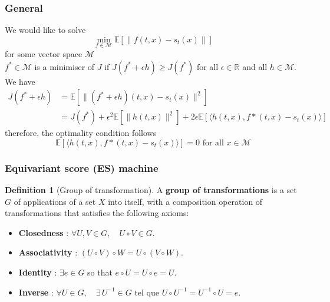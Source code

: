 \documentclass[a4paper,10pt]{article}
\theoremstyle{definition} %
\newtheorem{definition}{Definition}[section]
\theoremstyle{definition} %
\theoremstyle{definition} %
\theoremstyle{definition} %
\newcommand{\R}{\mathbb{R}}
\newcommand{\E}[1]{\mathbb{E} \left[ {#1} \right] }
\newcommand{\0}{\boldsymbol{0}}
\begin{document}
\subsubsection{General}
We would like to solve
\begin{equation*}
    \min_{f\in\mathcal{M}} \E{\| f(t,x)-s_t(x)\|}
\end{equation*}
for some vector space $\mathcal{M}$\\
$f^* \in \mathcal{M}$ is a minimiser of $J$ if $J(f^*+\epsilon h) \geq J(f^*)$ for all $\epsilon \in \R$ and all $h\in \mathcal{M}$. We have
\begin{align*}
    J(f^*+\epsilon h) &= \E{\|(f^*+\epsilon h)(t,x)-s_t(x)\|^2}\\
    & = J(f^*)+\epsilon^2\E{\|h(t,x)\|^2}+2\epsilon\E{\langle h(t,x),f*(t,x) - s_t(x) \rangle}
\end{align*}
therefore, the optimality condition follows
\begin{equation}\label{eq:optimal_condition_score_function}
    \E{\langle h(t,x),f*(t,x) - s_t(x) \rangle} = 0 \text{ for all } x \in \mathcal{M}
\end{equation}

\subsubsection{Equivariant score (ES) machine}
\begin{definition}[Group of transformation]
    A \textbf{group of transformations} is a set \( G \) of applications of a set \( X \) into itself, with a composition operation of transformations that satisfies the following axioms:
    \begin{itemize}[topsep=-5pt]
    \item[] \textbf{Closedness} : \( \forall U, V \in G, \quad U \circ V \in G \).
    \item[] \textbf{Associativity} : \( (U \circ V) \circ W = U \circ (V \circ W) \).
    \item[] \textbf{Identity} : \( \exists e \in G \) so that \( e \circ U = U \circ e = U \).
    \item[] \textbf{Inverse} : \( \forall U \in G, \quad \exists \,U^{-1} \in G \text{ tel que } U \circ U^{-1} = U^{-1} \circ U = e \).
\end{itemize}
\end{definition}



\end{document}
